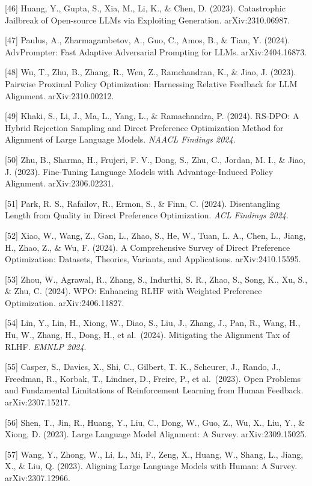 {[}46{]} Huang, Y., Gupta, S., Xia, M., Li, K., \& Chen, D. (2023). Catastrophic Jailbreak of Open-source LLMs via Exploiting Generation. arXiv:2310.06987.

{[}47{]} Paulus, A., Zharmagambetov, A., Guo, C., Amos, B., \& Tian, Y. (2024). AdvPrompter: Fast Adaptive Adversarial Prompting for LLMs. arXiv:2404.16873.

{[}48{]} Wu, T., Zhu, B., Zhang, R., Wen, Z., Ramchandran, K., \& Jiao, J. (2023). Pairwise Proximal Policy Optimization: Harnessing Relative Feedback for LLM Alignment. arXiv:2310.00212.

{[}49{]} Khaki, S., Li, J., Ma, L., Yang, L., \& Ramachandra, P. (2024). RS-DPO: A Hybrid Rejection Sampling and Direct Preference Optimization Method for Alignment of Large Language Models. \emph{NAACL Findings 2024}.

{[}50{]} Zhu, B., Sharma, H., Frujeri, F. V., Dong, S., Zhu, C., Jordan, M. I., \& Jiao, J. (2023). Fine-Tuning Language Models with Advantage-Induced Policy Alignment. arXiv:2306.02231.

{[}51{]} Park, R. S., Rafailov, R., Ermon, S., \& Finn, C. (2024). Disentangling Length from Quality in Direct Preference Optimization. \emph{ACL Findings 2024}.

{[}52{]} Xiao, W., Wang, Z., Gan, L., Zhao, S., He, W., Tuan, L. A., Chen, L., Jiang, H., Zhao, Z., \& Wu, F. (2024). A Comprehensive Survey of Direct Preference Optimization: Datasets, Theories, Variants, and Applications. arXiv:2410.15595.

{[}53{]} Zhou, W., Agrawal, R., Zhang, S., Indurthi, S. R., Zhao, S., Song, K., Xu, S., \& Zhu, C. (2024). WPO: Enhancing RLHF with Weighted Preference Optimization. arXiv:2406.11827.

{[}54{]} Lin, Y., Lin, H., Xiong, W., Diao, S., Liu, J., Zhang, J., Pan, R., Wang, H., Hu, W., Zhang, H., Dong, H., et al.~(2024). Mitigating the Alignment Tax of RLHF. \emph{EMNLP 2024}.

{[}55{]} Casper, S., Davies, X., Shi, C., Gilbert, T. K., Scheurer, J., Rando, J., Freedman, R., Korbak, T., Lindner, D., Freire, P., et al.~(2023). Open Problems and Fundamental Limitations of Reinforcement Learning from Human Feedback. arXiv:2307.15217.

{[}56{]} Shen, T., Jin, R., Huang, Y., Liu, C., Dong, W., Guo, Z., Wu, X., Liu, Y., \& Xiong, D. (2023). Large Language Model Alignment: A Survey. arXiv:2309.15025.

{[}57{]} Wang, Y., Zhong, W., Li, L., Mi, F., Zeng, X., Huang, W., Shang, L., Jiang, X., \& Liu, Q. (2023). Aligning Large Language Models with Human: A Survey. arXiv:2307.12966.

